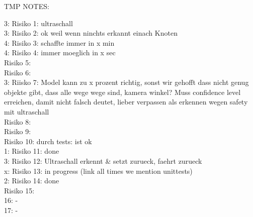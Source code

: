 TMP NOTES:

3: Risiko 1: ultraschall \\
3: Risiko 2: ok weil wenn ninchts erkannt einach Knoten \\
4: Risiko 3: schaffte immer in x min \\
4: Risiko 4: immer moeglich in x sec \\
Risiko 5:\\
Risiko 6:\\
3: Riisko 7: Model kann zu x prozent richtig, sonst wir gehofft dass nicht genug objekte gibt, dass alle wege wege sind, kamera winkel? Muss confidence level erreichen, damit nicht falsch deutet, lieber verpassen als erkennen wegen safety mit ultraschall\\
Risiko 8:\\
Risiko 9:\\
Risiko 10: durch tests: ist ok\\
1: Risiko 11: done\\
3: Risiko 12: Ultraschall erkennt \& setzt zurueck, faehrt zurueck\\
x: Risiko 13: in progress (link all times we mention unittests)\\
2: Risiko 14: done\\
Risiko 15:\\
16: -\\
17: -\\

